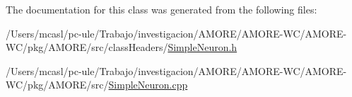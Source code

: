 The documentation for this class was generated from the following files:\begin{DoxyCompactItemize}
\item 
/Users/mcasl/pc-\/ule/Trabajo/investigacion/AMORE/AMORE-\/WC/AMORE-\/WC/pkg/AMORE/src/classHeaders/\hyperlink{_simple_neuron_8h}{SimpleNeuron.h}\item 
/Users/mcasl/pc-\/ule/Trabajo/investigacion/AMORE/AMORE-\/WC/AMORE-\/WC/pkg/AMORE/src/\hyperlink{_simple_neuron_8cpp}{SimpleNeuron.cpp}\end{DoxyCompactItemize}
